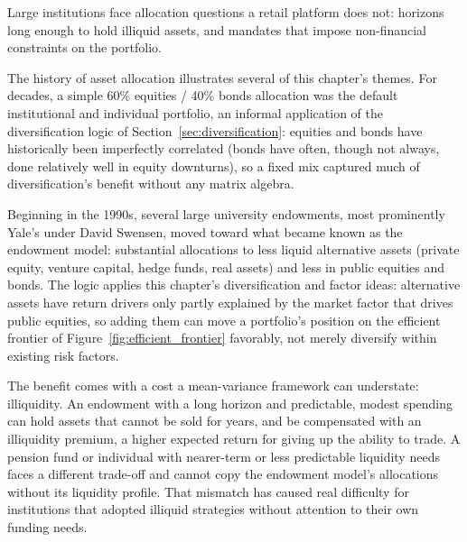 \documentclass[../ai_in_finance]{subfiles}
\begin{document}
Large institutions face allocation questions a retail platform does not: horizons long enough to hold illiquid assets, and mandates that impose non-financial constraints on the portfolio.

\label{sec:sixty-forty}

The history of asset allocation illustrates several of this chapter's themes. For decades, a simple 60\% equities / 40\% bonds allocation was the default institutional and individual portfolio, an informal application of the diversification logic of Section~\ref{sec:diversification}: equities and bonds have historically been imperfectly correlated (bonds have often, though not always, done relatively well in equity downturns), so a fixed mix captured much of diversification's benefit without any matrix algebra.

Beginning in the 1990s, several large university endowments, most prominently Yale's under David Swensen, moved toward what became known as the endowment model: substantial allocations to less liquid alternative assets (private equity, venture capital, hedge funds, real assets) and less in public equities and bonds. The logic applies this chapter's diversification and factor ideas: alternative assets have return drivers only partly explained by the market factor that drives public equities, so adding them can move a portfolio's position on the efficient frontier of Figure~\ref{fig:efficient_frontier} favorably, not merely diversify within existing risk factors.

The benefit comes with a cost a mean-variance framework can understate: illiquidity. An endowment with a long horizon and predictable, modest spending can hold assets that cannot be sold for years, and be compensated with an illiquidity premium, a higher expected return for giving up the ability to trade. A pension fund or individual with nearer-term or less predictable liquidity needs faces a different trade-off and cannot copy the endowment model's allocations without its liquidity profile. That mismatch has caused real difficulty for institutions that adopted illiquid strategies without attention to their own funding needs.
\end{document}
